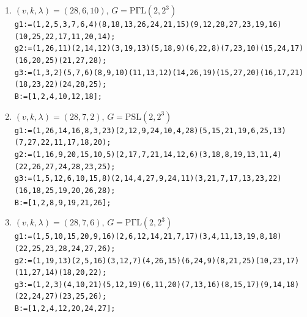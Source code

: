 \documentclass[a4paper,twopage,reqno,12pt]{amsart}
\theoremstyle{definition}
\numberwithin{equation}{section}
\newcommand{\PSL}{\mathrm{PSL}}
\newcommand{\PGaL}{\mathrm{P\Gamma L}}
\newcommand{\Aut}{\mathrm{Aut}}
\begin{document}
\begin{enumerate}
\item\label{28610_5} $(v,k,\lambda)=(28,6,10)$, $G=\PGaL(2,2^3)$\\
    {\scriptsize \texttt{g1:=(1,2,5,3,7,6,4)(8,18,13,26,24,21,15)(9,12,28,27,23,19,16)(10,25,22,17,11,20,14);}\\
    \texttt{g2:=(1,26,11)(2,14,12)(3,19,13)(5,18,9)(6,22,8)(7,23,10)(15,24,17)(16,20,25)(21,27,28);}\\
    \texttt{g3:=(1,3,2)(5,7,6)(8,9,10)(11,13,12)(14,26,19)(15,27,20)(16,17,21)(18,23,22)(24,28,25);}}\\
    \texttt{B:=[1,2,4,10,12,18];}\\

\item\label{2872} $(v,k,\lambda)=(28,7,2)$, $G=\PSL(2,2^3)$\\
    {\scriptsize 
    \texttt{g1:=(1,26,14,16,8,3,23)(2,12,9,24,10,4,28)(5,15,21,19,6,25,13)(7,27,22,11,17,18,20);}\\
    \texttt{g2:=(1,16,9,20,15,10,5)(2,17,7,21,14,12,6)(3,18,8,19,13,11,4)(22,26,27,24,28,23,25);}\\
    \texttt{g3:=(1,5,12,6,10,15,8)(2,14,4,27,9,24,11)(3,21,7,17,13,23,22)(16,18,25,19,20,26,28);}}\\
    \texttt{B:=[1,2,8,9,19,21,26];}\\ 

\item\label{2876} $(v,k,\lambda)=(28,7,6)$, $G=\PGaL(2,2^3)$\\
    {\scriptsize 
    \texttt{g1:=(1,5,10,15,20,9,16)(2,6,12,14,21,7,17)(3,4,11,13,19,8,18)(22,25,23,28,24,27,26);}\\
    \texttt{g2:=(1,19,13)(2,5,16)(3,12,7)(4,26,15)(6,24,9)(8,21,25)(10,23,17)(11,27,14)(18,20,22);}\\
    \texttt{g3:=(1,2,3)(4,10,21)(5,12,19)(6,11,20)(7,13,16)(8,15,17)(9,14,18)(22,24,27)(23,25,26);}}\\
    \texttt{B:=[1,2,4,12,20,24,27];}\\
    


\end{enumerate}
\end{document}
